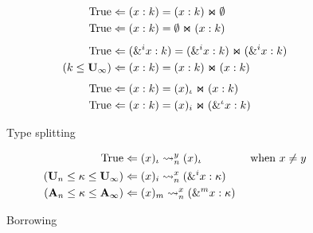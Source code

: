 \begin{figure*}[!h]
  \centering
  \begin{minipage}{0.45\linewidth}
    \begin{align*}
      \tsplit{\Ctrue&}{\bvar{x}{k}}{\bvar{x}{k}}{\Cempty}\\
      \tsplit{\Ctrue&}{\bvar{x}{k}}{\Cempty}{\bvar{x}{k}}\\[4pt]
      \tsplit{\Ctrue&}{\bvar{\borrow[i]{x}}{k}}
                      {\bvar{\borrow[i]{x}}{k}}{\bvar{\borrow[i]{x}}{k}}\\
      \tsplit{\Cleq{k}{\kun_\infty}&}{\bvar{x}{k}}{\bvar{x}{k}}{\bvar{x}{k}}\\[4pt]
      \tsplit{\Ctrue&}{\bvar{x}{k}}{\bshadow{x}}{\bvar{x}{k}}\\
      \tsplit{\Ctrue&}{\bvar{x}{k}}{\bshadow[i]{x}}{\bvar{\borrow{x}}{k}}
    \end{align*}
    \caption{Type splitting}
    \label{typesplit}
  \end{minipage}\quad
  \begin{minipage}{0.45\linewidth}
    \begin{align*}
      \tregion{\Ctrue&}{y}
        {\bshadow{x}}{\bshadow{x}}&\text{ when } x \neq y\\
      \tregion{(\kun_n\lk\kvar\lk\kun_\infty)&}{x}
        {\bshadow[i]{x}}{\bvar{\borrow[i]{x}}{\kvar}}\\
      \tregion{(\kaff_n\lk\kvar\lk\kaff_\infty)&}{x}
        {\bshadow[m]{x}}{\bvar{\borrow[m]{x}}{\kvar}}
    \end{align*}
    \caption{Borrowing}
    \label{typesplit}
  \end{minipage}
\end{figure*}

